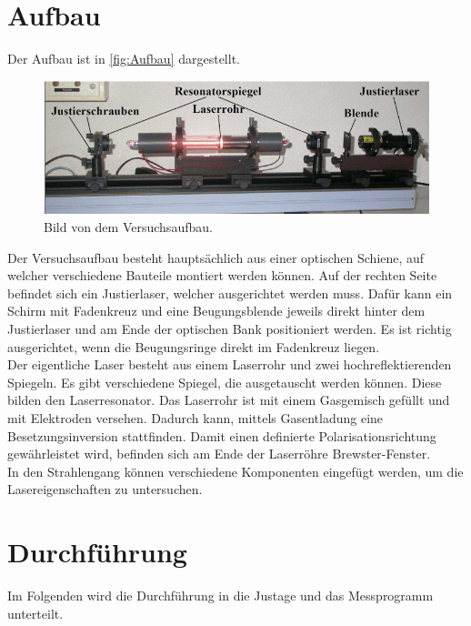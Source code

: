 \section{Aufbau}
\label{sec:Aufbau}
Der Aufbau ist in \autoref{fig:Aufbau} dargestellt.
\begin{figure}[H]
    \centering
    \includegraphics[scale=0.7]{Abbildungen/Aufbau.png}
    \caption{Bild von dem Versuchsaufbau.\cite{V61}}
    \label{fig:Aufbau}
\end{figure}
Der Versuchsaufbau besteht hauptsächlich aus einer optischen Schiene, auf welcher verschiedene Bauteile montiert werden können.
Auf der rechten Seite befindet sich ein Justierlaser, welcher ausgerichtet werden muss. Dafür kann ein Schirm mit Fadenkreuz und eine Beugungsblende
jeweils direkt hinter dem Justierlaser und am Ende der optischen Bank positioniert werden. Es ist richtig ausgerichtet, wenn die 
Beugungsringe direkt im Fadenkreuz liegen.\\
Der eigentliche Laser besteht aus einem Laserrohr und zwei hochreflektierenden Spiegeln.
Es gibt verschiedene Spiegel, die ausgetauscht werden können. Diese bilden den Laserresonator.
Das Laserrohr ist mit einem Gasgemisch gefüllt und mit Elektroden versehen. Dadurch kann, mittels Gasentladung eine Besetzungsinversion stattfinden.
Damit einen definierte Polarisationsrichtung gewährleistet wird, befinden sich am Ende der Laserröhre Brewster-Fenster.\\
In den Strahlengang können verschiedene Komponenten eingefügt werden, um die Lasereigenschaften zu untersuchen.

\section{Durchführung}
\label{sec:Durchführung}
Im Folgenden wird die Durchführung in die Justage und das Messprogramm unterteilt.

